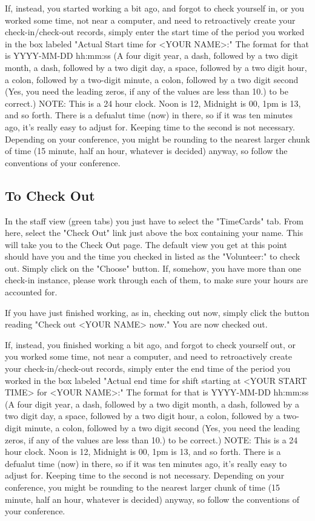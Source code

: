 \documentclass[captions=tablesignature]{scrartcl}
\begin{document}
If, instead, you started working a bit ago, and forgot to check
yourself in, or you worked some time, not near a computer, and need
to retroactively create your check-in/check-out records, simply
enter the start time of the period you worked in the box labeled
"Actual Start time for <YOUR NAME>:" The format for that is
YYYY-MM-DD hh:mm:ss (A four digit year, a dash, followed by a two
digit month, a dash, followed by a two digit day, a space, followed
by a two digit hour, a colon, followed by a two-digit minute, a
colon, followed by a two digit second (Yes, you need the leading
zeros, if any of the values are less than 10.) to be correct.)
NOTE: This is a 24 hour clock.  Noon is 12, Midnight is 00, 1pm is
13, and so forth.  There is a defualut time (now) in there, so if
it was ten minutes ago, it's really easy to adjust for.  Keeping
time to the second is not necessary.  Depending on your conference,
you might be rounding to the nearest larger chunk of time (15
minute, half an hour, whatever is decided) anyway, so follow the
conventions of your conference.
\subsection{To Check Out}
\label{sec-2-2}
In the staff view (green tabs) you just have to select the
"TimeCards" tab.  From here, select the "Check Out" link just above
the box containing your name.  This will take you to the Check Out
page.  The default view you get at this point should have you and
the time you checked in listed as the "Volunteer:" to check out.
Simply click on the "Choose" button.  If, somehow, you have more
than one check-in instance, please work through each of them, to
make sure your hours are accounted for.

If you have just finished working, as in, checking out now, simply
click the button reading "Check out <YOUR NAME> now."  You are now
checked out.

If, instead, you finished working a bit ago, and forgot to check
yourself out, or you worked some time, not near a computer, and
need to retroactively create your check-in/check-out records,
simply enter the end time of the period you worked in the box
labeled "Actual end time for shift starting at <YOUR START TIME>
for <YOUR NAME>:" The format for that is YYYY-MM-DD hh:mm:ss (A
four digit year, a dash, followed by a two digit month, a dash,
followed by a two digit day, a space, followed by a two digit hour,
a colon, followed by a two-digit minute, a colon, followed by a two
digit second (Yes, you need the leading zeros, if any of the values
are less than 10.) to be correct.)  NOTE: This is a 24 hour clock.
Noon is 12, Midnight is 00, 1pm is 13, and so forth.  There is a
defualut time (now) in there, so if it was ten minutes ago, it's
really easy to adjust for.  Keeping time to the second is not
necessary.  Depending on your conference, you might be rounding to
the nearest larger chunk of time (15 minute, half an hour, whatever
is decided) anyway, so follow the conventions of your conference.
\end{document}
